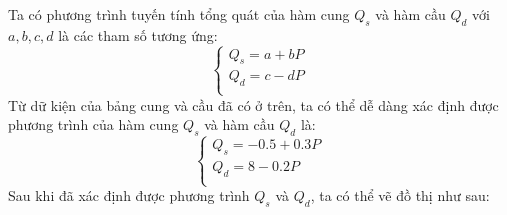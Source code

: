 \documentclass[11pt,aspectratio=169]{beamer}
\begin{document}
\begin{frame}
Ta có phương trình tuyến tính tổng quát của hàm cung $Q_{s}$ và hàm cầu $Q_{d}$ với $a, b, c, d$ là các tham số tương ứng:
\begin{equation*}
    \begin{cases}
    Q_{s}=a+bP\\
    Q_{d}=c-dP\\
    \end{cases}
    \end{equation*}
Từ dữ kiện của bảng cung và cầu đã có ở trên, ta có thể dễ dàng xác định được phương trình của hàm cung $Q_{s}$ và hàm cầu $Q_{d}$ là:
\begin{equation*}
    \begin{cases}
    Q_{s}=-0.5+0.3P\\
    Q_{d}=8-0.2P\\
    \end{cases}
    \end{equation*}
Sau khi đã xác định được phương trình $Q_{s}$ và $Q_{d}$, ta có thể vẽ đồ thị như sau:
\end{frame}
\begin{frame}
    \begin{center}
    \end{center}
\end{frame}
\end{document}
